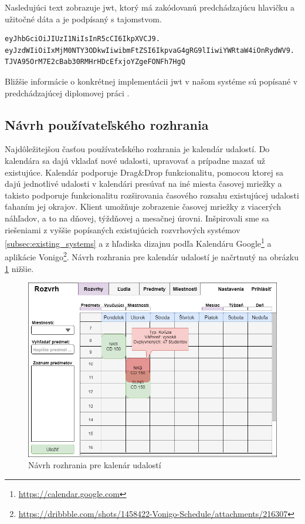 Nasledujúci text zobrazuje \acrshort{jwt}, ktorý má zakódovanú predchádzajúcu hlavičku a užitočné dáta
a je podpísaný s tajomstvom.

\begin{verbatim}
eyJhbGciOiJIUzI1NiIsInR5cCI6IkpXVCJ9.
eyJzdWIiOiIxMjM0NTY3ODkwIiwibmFtZSI6IkpvaG4gRG9lIiwiYWRtaW4iOnRydWV9.
TJVA95OrM7E2cBab30RMHrHDcEfxjoYZgeFONFh7HgQ
\end{verbatim}

Bližšie informácie o konkrétnej implementácii \acrshort{jwt} v našom systéme sú popísané
v predchádzajúcej diplomovej práci \cite{racak}.
\subsection{Návrh používateľského rozhrania}
\label{subsec:gui}

Najdôležitejšou časťou používateľského rozhrania je kalendár udalostí. Do kalendára
sa dajú vkladať nové udalosti, upravovať a prípadne mazať už existujúce. Kalendár
podporuje Drag\&Drop funkcionalitu, pomocou ktorej sa dajú jednotlivé udalosti v kalendári
presúvať na iné miesta časovej mriežky a takisto podporuje funkcionalitu rozširovania časového
rozsahu existujúcej udalosti ťahaním jej okrajov. Klient umožňuje zobrazenie časovej mriežky
z viacerých náhľadov, a to na dňovej, týždňovej a mesačnej úrovni. Inšpirovali sme sa riešeniami
z vyššie popísaných existujúcich rozvrhových systémov \ref{subsec:existing_systems}
a z hľadiska dizajnu podľa Kalendáru Google\footnote{\url{https://calendar.google.com}}
a aplikácie Vonigo\footnote{\url{https://dribbble.com/shots/1458422-Vonigo-Schedule/attachments/216307}}.
Návrh rozhrania pre kalendár udalostí je načrtnutý na obrázku \ref{fig:gui_design} nižšie.

\newpage
\begin{figure}[ht]
  \centering
  \includegraphics[width=1\columnwidth]{img/screen_view_schedule.png}
  \caption{\label{fig:gui_design}Návrh rozhrania pre kalenár udalostí}
\end{figure}


